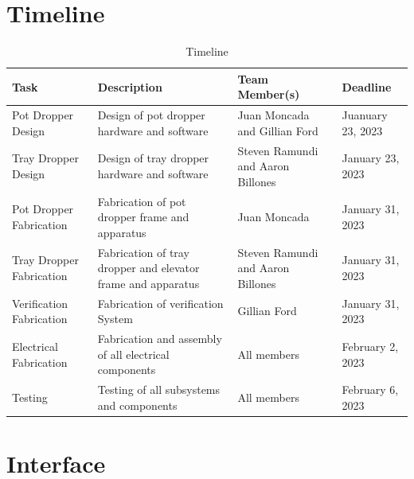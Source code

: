 \documentclass[12pt, titlepage]{article}
\begin{document}


\section{Timeline}


\begin{table}[H]
  \caption{Timeline}
\begin{tabular}{ |p{3cm}|p{5cm}|p{4cm}|p{2cm}| }
  \hline
  Task & Description & Team Member(s) & Deadline\\
  \hline
  Pot Dropper Design & Design of pot dropper hardware and software
  & Juan Moncada and Gillian Ford & Juanuary 23, 2023\\
  \hline
  Tray Dropper Design & Design of tray dropper hardware and software
  & Steven Ramundi and Aaron Billones & January 23, 2023\\
  \hline
  Pot Dropper Fabrication & Fabrication of pot dropper frame and apparatus
  & Juan Moncada & January 31, 2023\\
  \hline
  Tray Dropper Fabrication & Fabrication of tray dropper and elevator frame and apparatus
  & Steven Ramundi and Aaron Billones & January 31, 2023\\
  \hline
  Verification Fabrication & Fabrication of verification System
  & Gillian Ford & January 31, 2023\\
  \hline
  Electrical Fabrication & Fabrication and assembly of all electrical components
  & All members & February 2, 2023\\
  \hline
  Testing & Testing of all subsystems and components
  & All members & February 6, 2023\\
  \hline

\end{tabular}
\end{table}

% 

\newpage{}

\appendix

\section{Interface}
\end{document}
